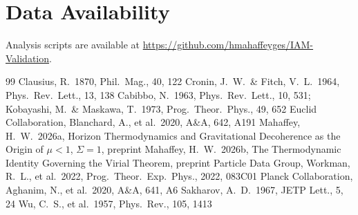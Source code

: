 \documentclass[12pt,a4paper]{article}
\begin{document}
\section*{Data Availability}
Analysis scripts are available at \url{https://github.com/hmahaffeyges/IAM-Validation}.


\begin{thebibliography}{99}
 Clausius, R.\ 1870, Phil.\ Mag., 40, 122
 Cronin, J.\ W.\ \& Fitch, V.\ L.\ 1964, Phys.\ Rev.\ Lett., 13, 138
 Cabibbo, N.\ 1963, Phys.\ Rev.\ Lett., 10, 531; Kobayashi, M.\ \& Maskawa, T.\ 1973, Prog.\ Theor.\ Phys., 49, 652
 Euclid Collaboration, Blanchard, A., et al.\ 2020, A\&A, 642, A191
 Mahaffey, H.\ W.\ 2026a, Horizon Thermodynamics and Gravitational Decoherence as the Origin of $\mu<1$, $\Sigma=1$, preprint
 Mahaffey, H.\ W.\ 2026b, The Thermodynamic Identity Governing the Virial Theorem, preprint
 Particle Data Group, Workman, R.\ L., et al.\ 2022, Prog.\ Theor.\ Exp.\ Phys., 2022, 083C01
 Planck Collaboration, Aghanim, N., et al.\ 2020, A\&A, 641, A6
 Sakharov, A.\ D.\ 1967, JETP Lett., 5, 24
 Wu, C.\ S., et al.\ 1957, Phys.\ Rev., 105, 1413
\end{thebibliography}
\end{document}
